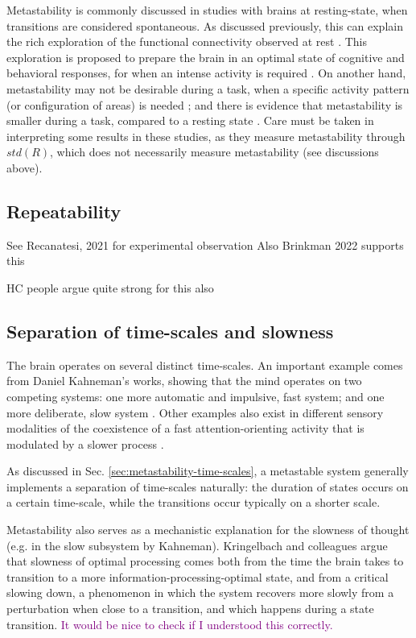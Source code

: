 \documentclass[preprint,superscriptaddress,showpacs,amsmath,amssymb,aps,pre,floatfix]{revtex4-1}
\theoremstyle{definition}
\begin{document}
Metastability is commonly discussed in studies with brains at resting-state, when transitions are considered spontaneous. As discussed previously, this can explain the rich exploration of the functional connectivity observed at rest \cite{kringelbach_2015}. This exploration is proposed to prepare the brain in an optimal state of cognitive and behavioral responses, for when an intense activity is required \cite{cordova-palomera_2017, hellyer_2015, kringelbach_2015}. 
On another hand, metastability may not be desirable during a task, when a specific activity pattern (or configuration of areas) is needed \cite{hellyer_2015}; and there is evidence that metastability is smaller during a task, compared to a resting state \cite{hellyer_2014}. Care must be taken in interpreting some results in these studies, as they measure metastability through $std(R)$, which does not necessarily measure metastability (see discussions above).

\subsection{Repeatability}
See Recanatesi, 2021 for experimental observation
Also Brinkman 2022 supports this

HC people argue quite strong for this also


\subsection{Separation of time-scales and slowness}
The brain operates on several distinct time-scales. An important example comes from Daniel Kahneman's works, showing that the mind operates on two competing systems: one more automatic and impulsive, fast system; and one more deliberate, slow system \cite{kahneman_2011, kringelbach_2015}. Other examples also exist in different sensory modalities of the coexistence of a fast attention-orienting activity  that is modulated by a slower process \cite{kringelbach_2015, litwin-kumar_2012}.

As discussed in  Sec. \ref{sec:metastability-time-scales}, a metastable system generally implements a separation of time-scales naturally: the duration of states occurs on a certain time-scale, while the transitions occur typically on a shorter scale. 

Metastability also serves as a mechanistic explanation for the slowness of thought (e.g. in the slow subsystem by Kahneman). Kringelbach and colleagues \cite{kringelbach_2015} argue that slowness of optimal processing comes both from the time the brain takes to transition to a more information-processing-optimal state, and from a critical slowing down, a phenomenon in which the system recovers more slowly from a perturbation when close to a transition, and which happens during a state transition. \textcolor{purple}{It would be nice to check if I understood this correctly.}
\end{document}
